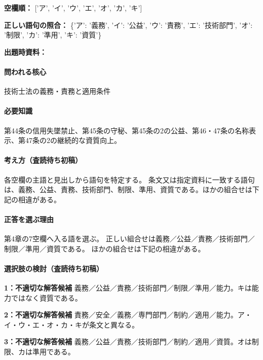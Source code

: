 \noindent\textbf{空欄順：} ['ア', 'イ', 'ウ', 'エ', 'オ', 'カ', 'キ']\par

\noindent\textbf{正しい語句の照合：} \{'ア': '義務', 'イ': '公益', 'ウ': '責務', 'エ': '技術部門', 'オ': '制限', 'カ': '準用', 'キ': '資質'\}\par

\noindent\textbf{出題時資料：} \par

\paragraph{問われる核心} 技術士法の義務・責務と適用条件

\paragraph{必要知識} 第44条の信用失墜禁止、第45条の守秘、第45条の2の公益、第46・47条の名称表示、第47条の2の継続的な資質向上。

\paragraph{考え方（査読待ち初稿）} 各空欄の主語と見出しから語句を特定する。 条文又は指定資料に一致する語句は、義務、公益、責務、技術部門、制限、準用、資質である。ほかの組合せは下記の相違がある。

\paragraph{正答を選ぶ理由} 第4章の7空欄へ入る語を選ぶ。 正しい組合せは義務／公益／責務／技術部門／制限／準用／資質である。 ほかの組合せは下記の相違がある。

\paragraph{選択肢の検討（査読待ち初稿）}\mbox{}\par

\noindent\textbf{1：不適切な解答候補} 義務／公益／責務／技術部門／制限／準用／能力。キは能力ではなく資質である。\par

\noindent\textbf{2：不適切な解答候補} 責務／安全／義務／専門部門／制約／適用／能力。ア・イ・ウ・エ・オ・カ・キが条文と異なる。\par

\noindent\textbf{3：不適切な解答候補} 義務／公益／責務／技術部門／制約／適用／資質。オは制限、カは準用である。\par


